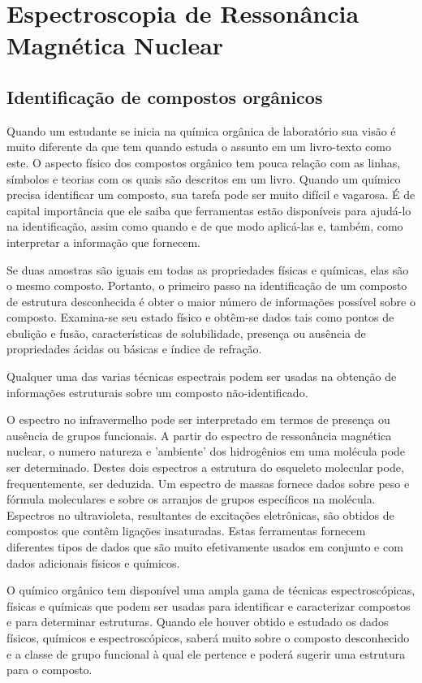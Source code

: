 \chapter{Espectroscopia de Ressonância Magnética Nuclear}
\section{Identificação de compostos orgânicos}
Quando um estudante se inicia na química orgânica de laboratório sua visão é muito diferente da que tem quando estuda o assunto em um livro-texto como este. O aspecto físico dos compostos orgânico tem pouca relação com as linhas, símbolos e teorias com os quais são descritos em um livro. Quando um químico precisa identificar um composto, sua tarefa pode ser muito difícil e vagarosa. É de capital importância que ele saiba que ferramentas estão disponíveis para ajudá-lo na identificação, assim como quando e de que modo aplicá-las e, também, como interpretar a informação que fornecem. 

Se duas amostras são iguais em todas as propriedades físicas e químicas, elas são o mesmo composto. Portanto, o primeiro passo na identificação de um composto de estrutura desconhecida é obter o maior número de informações possível sobre o composto. Examina-se seu estado físico e obtêm-se dados tais como pontos de ebulição e fusão, características de solubilidade, presença ou ausência de propriedades ácidas ou básicas e índice de refração. 

Qualquer uma das varias técnicas espectrais podem ser usadas na obtenção de informações estruturais sobre um composto não-identificado.

O espectro no infravermelho pode ser interpretado em termos de presença ou ausência de grupos funcionais. A partir do espectro de ressonância magnética nuclear, o numero natureza e 'ambiente' dos hidrogênios em uma molécula pode ser determinado. Destes dois espectros a estrutura do esqueleto molecular pode, frequentemente, ser deduzida. Um espectro de massas fornece dados sobre peso e fórmula moleculares e sobre os arranjos de grupos específicos na molécula. Espectros no ultravioleta, resultantes de excitações eletrônicas, são obtidos de compostos que contêm ligações insaturadas. Estas ferramentas fornecem diferentes tipos de dados que são muito efetivamente usados em conjunto e com dados adicionais físicos e químicos.

O químico orgânico tem disponível uma ampla gama de técnicas espectroscópicas, físicas e químicas que podem ser usadas para identificar e caracterizar compostos e para determinar estruturas. Quando ele houver obtido e estudado os dados físicos, químicos e espectroscópicos, saberá muito sobre o composto desconhecido e a classe de grupo funcional à qual ele pertence e poderá sugerir uma estrutura para o composto.

